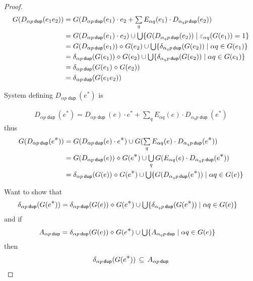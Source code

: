 \documentclass{article}
\renewcommand\smash{\mathrel{\diamond}}
\newcommand\ssum{\mathop{\textstyle\sum}}
\newcommand\pdup{\mathop{\mathsf{dup}}}
\renewcommand\star{^{\textstyle *}}
\newcommand\sbigcup{\mathop{\textstyle\bigcup}}
\begin{document}
\begin{proof}
\begin{align*}
G(D_{\alpha p\pdup}(e_1e_2))
&= G(D_{\alpha p\pdup}(e_1)\cdot e_2 + \ssum_{q} E_{\alpha q}(e_1)\cdot D_{\alpha_q p\pdup}(e_2))\\
&= G(D_{\alpha p\pdup}(e_1)\cdot e_2) \cup \sbigcup \set{G(D_{\alpha_q p\pdup}(e_2))}{\eps_{\alpha q}(G(e_1))=1}\\
&= G(D_{\alpha p\pdup}(e_1))\smash G(e_2) \cup \sbigcup \set{\delta_{\alpha_q p\pdup}(G(e_2))}{\alpha q\in G(e_1)}\\
&= \delta_{\alpha p\pdup}(G(e_1))\smash G(e_2) \cup \sbigcup \set{\delta_{\alpha_q p\pdup}(G(e_2))}{\alpha q\in G(e_1)}\\
&= \delta_{\alpha p\pdup}(G(e_1)\smash G(e_2))\\
&= \delta_{\alpha p\pdup}(G(e_1e_2))
\end{align*}

System defining $D_{\alpha p\pdup}(e\star)$ is

\begin{align*}
D_{\alpha p\pdup}(e\star) = D_{\alpha p\pdup}(e)\cdot e\star + \ssum_{q} E_{\alpha q}(e)\cdot D_{\alpha_qp\pdup}(e\star)
\end{align*}
thus
\begin{align*}
G(D_{\alpha p\pdup}(e\star))
&= G(D_{\alpha p\pdup}(e)\cdot e\star) \cup G(\ssum_{q}E_{\alpha q}(e)\cdot D_{\alpha_q p\pdup}(e\star))\\
&= G(D_{\alpha p\pdup}(e))\smash G(e\star) \cup \sbigcup_q G(E_{\alpha q}(e)\cdot D_{\alpha_q p\pdup}(e\star))\\
&= \delta_{\alpha p\pdup}(G(e))\smash G(e\star) \cup \sbigcup \set{G(D_{\alpha_q p\pdup}(e\star))}{\alpha q\in G(e)}\\
\end{align*}

Want to show that
\begin{align*}
\delta_{\alpha p\pdup}(G(e\star))
&= \delta_{\alpha p\pdup}(G(e))\smash G(e\star) \cup \sbigcup \set{\delta_{\alpha_q p\pdup}(G(e\star))}{\alpha q\in G(e)}
\end{align*}
and if
\begin{align*}
A_{\alpha p\pdup}
&= \delta_{\alpha p\pdup}(G(e))\smash G(e\star) \cup \sbigcup \set{A_{\alpha_q p\pdup}}{\alpha q\in G(e)}
\end{align*}
then
\begin{align*}
\delta_{\alpha p\pdup}(G(e\star)) \subs A_{\alpha p\pdup}
\end{align*}


\end{proof}
\end{document}
